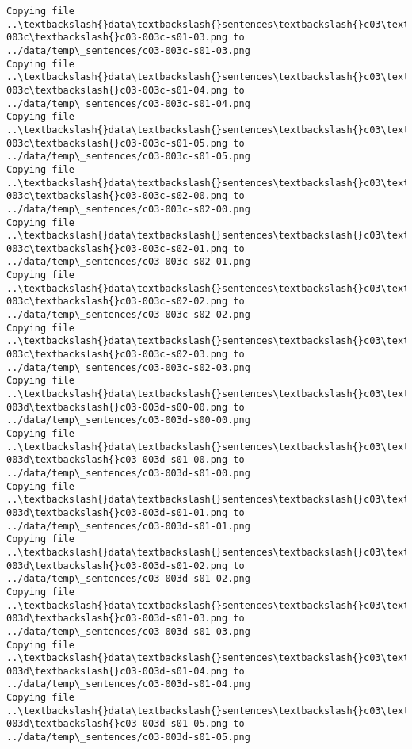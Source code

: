\documentclass[11pt]{article}
\begin{document}
\begin{Verbatim}[commandchars=\\\{\}]
Copying file ..\textbackslash{}data\textbackslash{}sentences\textbackslash{}c03\textbackslash{}c03-003c\textbackslash{}c03-003c-s01-03.png to
../data/temp\_sentences/c03-003c-s01-03.png
Copying file ..\textbackslash{}data\textbackslash{}sentences\textbackslash{}c03\textbackslash{}c03-003c\textbackslash{}c03-003c-s01-04.png to
../data/temp\_sentences/c03-003c-s01-04.png
Copying file ..\textbackslash{}data\textbackslash{}sentences\textbackslash{}c03\textbackslash{}c03-003c\textbackslash{}c03-003c-s01-05.png to
../data/temp\_sentences/c03-003c-s01-05.png
Copying file ..\textbackslash{}data\textbackslash{}sentences\textbackslash{}c03\textbackslash{}c03-003c\textbackslash{}c03-003c-s02-00.png to
../data/temp\_sentences/c03-003c-s02-00.png
Copying file ..\textbackslash{}data\textbackslash{}sentences\textbackslash{}c03\textbackslash{}c03-003c\textbackslash{}c03-003c-s02-01.png to
../data/temp\_sentences/c03-003c-s02-01.png
Copying file ..\textbackslash{}data\textbackslash{}sentences\textbackslash{}c03\textbackslash{}c03-003c\textbackslash{}c03-003c-s02-02.png to
../data/temp\_sentences/c03-003c-s02-02.png
Copying file ..\textbackslash{}data\textbackslash{}sentences\textbackslash{}c03\textbackslash{}c03-003c\textbackslash{}c03-003c-s02-03.png to
../data/temp\_sentences/c03-003c-s02-03.png
Copying file ..\textbackslash{}data\textbackslash{}sentences\textbackslash{}c03\textbackslash{}c03-003d\textbackslash{}c03-003d-s00-00.png to
../data/temp\_sentences/c03-003d-s00-00.png
Copying file ..\textbackslash{}data\textbackslash{}sentences\textbackslash{}c03\textbackslash{}c03-003d\textbackslash{}c03-003d-s01-00.png to
../data/temp\_sentences/c03-003d-s01-00.png
Copying file ..\textbackslash{}data\textbackslash{}sentences\textbackslash{}c03\textbackslash{}c03-003d\textbackslash{}c03-003d-s01-01.png to
../data/temp\_sentences/c03-003d-s01-01.png
Copying file ..\textbackslash{}data\textbackslash{}sentences\textbackslash{}c03\textbackslash{}c03-003d\textbackslash{}c03-003d-s01-02.png to
../data/temp\_sentences/c03-003d-s01-02.png
Copying file ..\textbackslash{}data\textbackslash{}sentences\textbackslash{}c03\textbackslash{}c03-003d\textbackslash{}c03-003d-s01-03.png to
../data/temp\_sentences/c03-003d-s01-03.png
Copying file ..\textbackslash{}data\textbackslash{}sentences\textbackslash{}c03\textbackslash{}c03-003d\textbackslash{}c03-003d-s01-04.png to
../data/temp\_sentences/c03-003d-s01-04.png
Copying file ..\textbackslash{}data\textbackslash{}sentences\textbackslash{}c03\textbackslash{}c03-003d\textbackslash{}c03-003d-s01-05.png to
../data/temp\_sentences/c03-003d-s01-05.png

\end{Verbatim}
\end{document}
